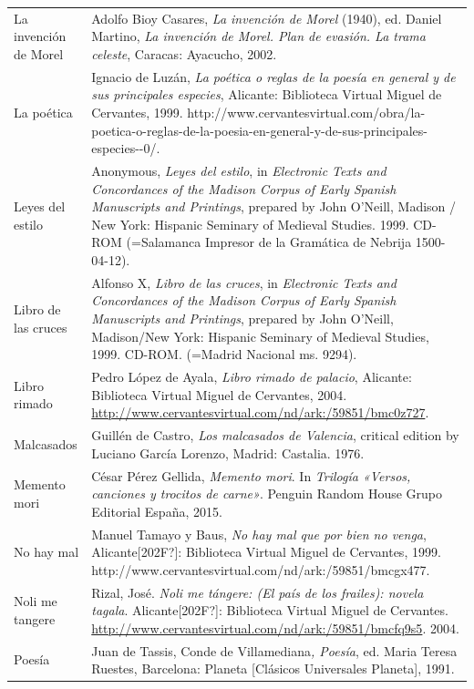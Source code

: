 \documentclass[10pt]{article}
\begin{document}
\begin{flushleft}
\begin{supertabular}{m{1.7955599in}m{4.42126in}}
La invención de Morel  &
Adolfo Bioy Casares, \textit{La invención de Morel} (1940), ed. Daniel Martino, \textit{La invención de Morel. Plan de evasión. La trama celeste}, Caracas: Ayacucho, 2002.\\
La poética &
Ignacio de Luzán, \textit{La poética o reglas de la poesía en general y de sus principales especies}, Alicante: Biblioteca Virtual Miguel de Cervantes, 1999. http://www.cervantesvirtual.com/obra/la-poetica-o-reglas-de-la-poesia-en-general-y-de-sus-principales-especies-{}-0/.\\
Leyes del estilo  &
Anonymous, \textit{Leyes del estilo}, in \textit{Electronic Texts and Concordances of the Madison Corpus of Early Spanish Manuscripts and Printings},\textit{ }prepared by John O’Neill, Madison / New York: Hispanic Seminary of Medieval Studies. 1999. CD-ROM (=Salamanca Impresor de la Gramática de Nebrija 1500-04-12).\\
Libro de las cruces  &
Alfonso X, \textit{Libro de las cruces}, in \textit{Electronic Texts and Concordances of the Madison Corpus of Early Spanish Manuscripts and Printings},\textit{ }prepared by John O’Neill, Madison/New York: Hispanic Seminary of Medieval Studies, 1999. CD-ROM. (=Madrid Nacional ms. 9294).\\
Libro rimado  &
Pedro López de Ayala,\textit{ Libro rimado de palacio}, Alicante: Biblioteca Virtual Miguel de Cervantes,\textit{ }2004.\textit{ }\url{http://www.cervantesvirtual.com/nd/ark:/59851/bmc0z727}.\\
Malcasados  &
Guillén de Castro, \textit{Los malcasados de Valencia}, critical edition by Luciano García Lorenzo, Madrid: Castalia. 1976.\\
Memento mori  &
César Pérez Gellida, \textit{Memento mori}. In \textit{Trilogía «Versos, canciones y trocitos de carne»}. Penguin Random House Grupo Editorial España, 2015.\\
No hay mal &
Manuel Tamayo y Baus, \textit{No hay mal que por bien no venga}, Alicante[202F?]: Biblioteca Virtual Miguel de Cervantes, 1999. http://www.cervantesvirtual.com/nd/ark:/59851/bmcgx477.\\
Noli me tangere  &
Rizal, José. \textit{Noli me tángere: (El país de los frailes): novela tagala}. Alicante[202F?]: Biblioteca Virtual Miguel de Cervantes. \url{http://www.cervantesvirtual.com/nd/ark:/59851/bmcfq9s5}. 2004.\\
Poesía  &
Juan de Tassis, Conde de Villamediana\textit{, Poesía}, ed. Maria Teresa Ruestes, Barcelona: Planeta [Clásicos Universales Planeta], 1991.\\

\end{supertabular}
\end{flushleft}
\end{document}

